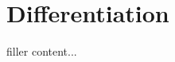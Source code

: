 \documentclass[../../templates/section]{subfiles}
\begin{document}
\section{Differentiation}\label{sec:differentiation}

filler content...
\end{document}
